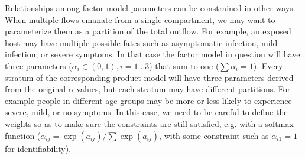 Relationships among factor model parameters can be constrained in other ways. When multiple flows emanate from a single compartment, we may want to parameterize them as a partition of the total outflow. For example, an exposed host may have multiple possible fates such as asymptomatic infection, mild infection, or severe symptoms. In that case the factor model in question will have three parameters ($\alpha_i \in (0,1), i = 1 \ldots 3$) that sum to one ($\sum \alpha_i = 1)$. Every stratum of the corresponding product model will have three parameters derived from the original $\alpha$ values,  but each stratum may have different partitions. For example people in different age groups may be more or less likely to experience severe, mild, or no symptoms. In this case, we need to be careful to define the weights so as to make sure the constraints are still satisfied, e.g. with a softmax function ($\alpha_{ij} = \exp(a_{ij})/\sum \exp(a_{ij})$, with some constraint such as $\alpha_{i1} = 1$ for identifiability).

